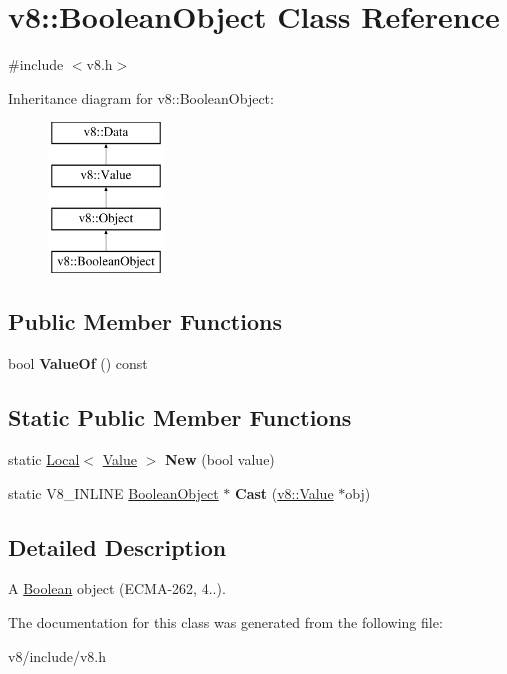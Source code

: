 \hypertarget{classv8_1_1BooleanObject}{}\section{v8\+:\+:Boolean\+Object Class Reference}
\label{classv8_1_1BooleanObject}


{\ttfamily \#include $<$v8.\+h$>$}

Inheritance diagram for v8\+:\+:Boolean\+Object\+:\begin{figure}[H]
\begin{center}
\leavevmode
\includegraphics[height=4.000000cm]{classv8_1_1BooleanObject}
\end{center}
\end{figure}
\subsection*{Public Member Functions}
\begin{DoxyCompactItemize}
\item 
\hypertarget{classv8_1_1BooleanObject_a283419656e641bcd9588dee56c0a0686}{}bool {\bfseries Value\+Of} () const \label{classv8_1_1BooleanObject_a283419656e641bcd9588dee56c0a0686}

\end{DoxyCompactItemize}
\subsection*{Static Public Member Functions}
\begin{DoxyCompactItemize}
\item 
\hypertarget{classv8_1_1BooleanObject_af57ca9198a6c6d00617da80b3f705e37}{}static \hyperlink{classv8_1_1Local}{Local}$<$ \hyperlink{classv8_1_1Value}{Value} $>$ {\bfseries New} (bool value)\label{classv8_1_1BooleanObject_af57ca9198a6c6d00617da80b3f705e37}

\item 
\hypertarget{classv8_1_1BooleanObject_ac701398c9b1c74fbce31d66106c9a87f}{}static V8\+\_\+\+I\+N\+L\+I\+N\+E \hyperlink{classv8_1_1BooleanObject}{Boolean\+Object} $\ast$ {\bfseries Cast} (\hyperlink{classv8_1_1Value}{v8\+::\+Value} $\ast$obj)\label{classv8_1_1BooleanObject_ac701398c9b1c74fbce31d66106c9a87f}

\end{DoxyCompactItemize}


\subsection{Detailed Description}
A \hyperlink{classv8_1_1Boolean}{Boolean} object (E\+C\+M\+A-\/262, 4..). 

The documentation for this class was generated from the following file\+:\begin{DoxyCompactItemize}
\item 
v8/include/v8.\+h\end{DoxyCompactItemize}
